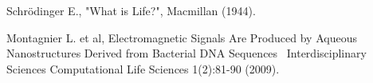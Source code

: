 \documentclass[a4paper,9pt]{article}
\begin{document}
\begin{thebibliography}{99}
 Schrödinger E., "What is Life?", Macmillan (1944). 

 Montagnier L. et al, Electromagnetic Signals Are Produced by Aqueous Nanostructures Derived from Bacterial DNA Sequences  Interdisciplinary Sciences Computational Life Sciences 1(2):81-90 (2009).

 




\end{thebibliography}
\end{document}
